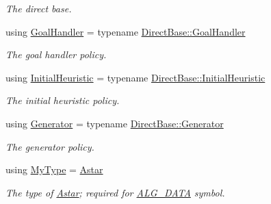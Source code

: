\begin{DoxyCompactItemize}
\begin{DoxyCompactList}\small\item\em The direct base. \end{DoxyCompactList}\item 
using \hyperlink{structalgorithm_1_1Astar_a425e2999824dd42a4cc5f403e8348192}{Goal\+Handler} = typename \hyperlink{structalgorithm_1_1Algorithm_af9111b0a505a193a2c4878b710b8ea65}{Direct\+Base\+::\+Goal\+Handler}\hypertarget{structalgorithm_1_1Astar_a425e2999824dd42a4cc5f403e8348192}{}\label{structalgorithm_1_1Astar_a425e2999824dd42a4cc5f403e8348192}

\begin{DoxyCompactList}\small\item\em The goal handler policy. \end{DoxyCompactList}\item 
using \hyperlink{structalgorithm_1_1Astar_a8fe594114404a0d4aff27146381328f6}{Initial\+Heuristic} = typename \hyperlink{structalgorithm_1_1Algorithm_aa0c111908e844c0ff5cfe78f778bba52}{Direct\+Base\+::\+Initial\+Heuristic}\hypertarget{structalgorithm_1_1Astar_a8fe594114404a0d4aff27146381328f6}{}\label{structalgorithm_1_1Astar_a8fe594114404a0d4aff27146381328f6}

\begin{DoxyCompactList}\small\item\em The initial heuristic policy. \end{DoxyCompactList}\item 
using \hyperlink{structalgorithm_1_1Astar_aba01d94440189cfa484824669a4f76b4}{Generator} = typename \hyperlink{structalgorithm_1_1Algorithm_a4b5d0c94b49b586bd31af92ed6ec94ad}{Direct\+Base\+::\+Generator}\hypertarget{structalgorithm_1_1Astar_aba01d94440189cfa484824669a4f76b4}{}\label{structalgorithm_1_1Astar_aba01d94440189cfa484824669a4f76b4}

\begin{DoxyCompactList}\small\item\em The generator policy. \end{DoxyCompactList}\item 
using \hyperlink{structalgorithm_1_1Astar_a98c52937042917c6945cff9f09c90cf8}{My\+Type} = \hyperlink{structalgorithm_1_1Astar}{Astar}\hypertarget{structalgorithm_1_1Astar_a98c52937042917c6945cff9f09c90cf8}{}\label{structalgorithm_1_1Astar_a98c52937042917c6945cff9f09c90cf8}

\begin{DoxyCompactList}\small\item\em The type of \hyperlink{structAstar}{Astar}; required for \hyperlink{algorithm_8h_a64c012078deee9a30405e18ec11e6360}{A\+L\+G\+\_\+\+D\+A\+TA} symbol. \end{DoxyCompactList}\end{DoxyCompactItemize}
